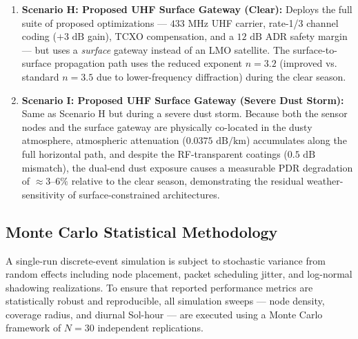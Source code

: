 \documentclass{ijuc}
\begin{document}
\begin{enumerate}
    \item \textbf{Scenario H: Proposed UHF Surface Gateway (Clear):} Deploys the full suite of proposed optimizations --- $433\text{ MHz}$ UHF carrier, rate-1/3 channel coding ($+3\text{ dB}$ gain), TCXO compensation, and a $12\text{ dB}$ ADR safety margin --- but uses a \emph{surface} gateway instead of an LMO satellite. The surface-to-surface propagation path uses the reduced exponent $n=3.2$ (improved vs. standard $n=3.5$ due to lower-frequency diffraction) during the clear season.
    \item \textbf{Scenario I: Proposed UHF Surface Gateway (Severe Dust Storm):} Same as Scenario H but during a severe dust storm. Because both the sensor nodes and the surface gateway are physically co-located in the dusty atmosphere, atmospheric attenuation ($0.0375\text{ dB/km}$) accumulates along the full horizontal path, and despite the RF-transparent coatings ($0.5\text{ dB}$ mismatch), the dual-end dust exposure causes a measurable PDR degradation of $\approx 3$--$6\%$ relative to the clear season, demonstrating the residual weather-sensitivity of surface-constrained architectures.
\end{enumerate}

\subsection{Monte Carlo Statistical Methodology}
\label{subsec:montecarlo}

A single-run discrete-event simulation is subject to stochastic variance from random effects including node placement, packet scheduling jitter, and log-normal shadowing realizations. To ensure that reported performance metrics are statistically robust and reproducible, all simulation sweeps --- node density, coverage radius, and diurnal Sol-hour --- are executed using a Monte Carlo framework of $N = 30$ independent replications.
\end{document}
